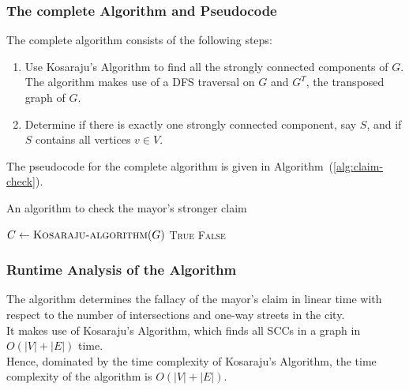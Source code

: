 \documentclass[12pt]{report}
\begin{document}
    \subsubsection*{The complete Algorithm and Pseudocode}
    The complete algorithm consists of the following steps:
    \begin{enumerate}
        \item
        Use Kosaraju's Algorithm to find all the strongly connected components of $G$.
        The algorithm makes use of a DFS traversal on $G$ and $G^{T}$, the transposed graph of $G$.
        \item Determine if there is exactly one strongly connected component, say $S$, and if $S$ contains all vertices $v \in V$.
    \end{enumerate}
    The pseudocode for the complete algorithm is given in Algorithm~(\ref{alg:claim-check}).

    \begin{algorithm}
        \caption{An algorithm to check the mayor's stronger claim}
        \label{alg:claim-check}
        \begin{algorithmic}[1]
            \State $C \gets \Call{Kosaraju-algorithm}{G}$ 
                \State \Return \textsc{True}
            \Else
                \State \Return \textsc{False}
            \EndIf
            \EndProcedure
        \end{algorithmic}
    \end{algorithm}

    \subsubsection*{Runtime Analysis of the Algorithm}
    The algorithm determines the fallacy of the mayor's claim in linear time with respect to the number of intersections and one-way streets in the city. \\
    It makes use of Kosaraju's Algorithm, which finds all SCCs in a graph in $O(|V|+|E|)$ time.
    \vspace*{10pt} \\
    Hence, dominated by the time complexity of Kosaraju's Algorithm, the time complexity of the algorithm is $O(|V|+|E|)$.
\end{document}
